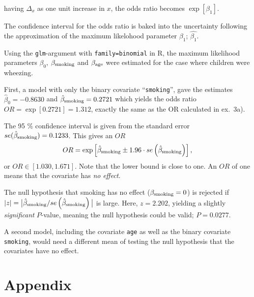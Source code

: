 \documentclass[a4paper,11pt]{article}
\begin{document}
\begin{enumerate}[label=\alph*)]
        having $\Delta_x$ as one unit increase in $x$, the odds ratio becomes $\exp[\beta_1]$. 

        The confidence interval for the odds ratio is baked into the uncertainty following the approximation of the maximum likelohood parameter $\beta_1$; $\hat{\beta_1}$. 

        Using the \texttt{glm}-argument with \texttt{family=binomial} in R, the maximum likelihood parameters $\beta_0$, $\beta_{\rm smoking}$ and $\beta_{\rm age}$ were estimated for the case where children were wheezing.

        First, a model with only the binary covariate ``\texttt{smoking}'', gave the estimates $\hat{\beta}_0 = -0.8630$ and $\hat{\beta}_{\rm smoking} = 0.2721$ which yields the odds ratio $OR = \exp[0.2721] = 1.312$, exactly the same as the OR calculated in ex.~3a). 
        
        The 95 \% confidence interval is given from the standard error $se(\hat{\beta}_{\rm smoking}) = 0.1233$. This gives an $OR$
        \begin{equation}
         OR = \exp \left[ \hat{\beta}_{\rm smoking} \pm 1.96 \cdot se\left( \hat{\beta}_{\rm smoking} \right) \right],
            \label{OR}
        \end{equation}
        or  $OR \in \left[1.030, 1.671  \right]$. Note that the lower bound is close to one. An $OR$ of one means that the covariate has \textit{no effect}. 
        
        The null hypothesis that smoking has no effect ($\beta_{\rm smoking} = 0$) is rejected if $|z| = \big| \hat{\beta}_{\rm smoking} / se\left( \hat{\beta}_{\rm smoking}  \right) \big|$ is large. Here, $z = 2.202$, yielding a slightly \textit{significant} $P$-value, meaning the null hypothesis could be valid; $P = 0.0277$. 

        A second model, including the covariate \texttt{age} as well as the binary covariate \texttt{smoking}, would need a different mean of testing the null hypothesis that the covariates have no effect. 

\end{enumerate}



%
%

\clearpage
\appendix
\section{Appendix}
\label{sec:appendix}
\end{document}
